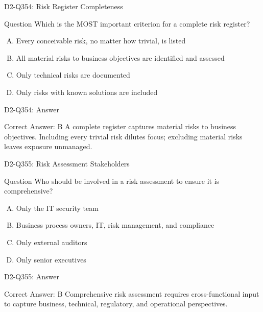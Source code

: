 \documentclass{beamer}
\begin{document}
\begin{frame}{D2-Q354: Risk Register Completeness}
	\begin{block}{Question}
		Which is the MOST important criterion for a complete risk register?
	\end{block}
	\begin{enumerate}[(A)]
		\item Every conceivable risk, no matter how trivial, is listed
		\item All material risks to business objectives are identified and assessed
		\item Only technical risks are documented
		\item Only risks with known solutions are included
	\end{enumerate}
\end{frame}
\begin{frame}{D2-Q354: Answer}
	\begin{block}{Correct Answer: B}
		A complete register captures material risks to business objectives. Including every trivial risk dilutes focus; excluding material risks leaves exposure unmanaged.
	\end{block}
\end{frame}

\begin{frame}{D2-Q355: Risk Assessment Stakeholders}
	\begin{block}{Question}
		Who should be involved in a risk assessment to ensure it is comprehensive?
	\end{block}
	\begin{enumerate}[(A)]
		\item Only the IT security team
		\item Business process owners, IT, risk management, and compliance
		\item Only external auditors
		\item Only senior executives
	\end{enumerate}
\end{frame}
\begin{frame}{D2-Q355: Answer}
	\begin{block}{Correct Answer: B}
		Comprehensive risk assessment requires cross-functional input to capture business, technical, regulatory, and operational perspectives.
	\end{block}
\end{frame}
\end{document}
